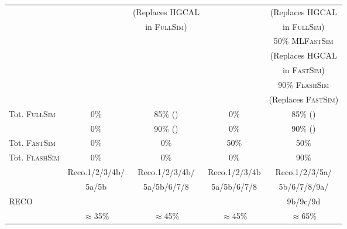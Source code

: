 \begin{table}[htbp]
\begin{tabular}{|l|c|c|c|c|}
	\cellcolor{tablerowheader}                &                 & (Replaces HGCAL &                       & (Replaces HGCAL   \\
	\cellcolor{tablerowheader}                &                 & in \textsc{FullSim})  
		                                      &                 & in \textsc{FullSim})    \\ 
	\cellcolor{tablerowheader}                &                 &                       &                       & 50\% \textsc{MLFastSim}  \\  
	\cellcolor{tablerowheader}                &                 &                       &                       & (Replaces HGCAL   \\
	\cellcolor{tablerowheader}                &                 &                       &                       & in \textsc{FastSim})   \\
	\cellcolor{tablerowheader}                &                 &                       &                       & 90\% \textsc{FlashSim}  \\  
	\cellcolor{tablerowheader}                &                 &                       &                       & (Replaces \textsc{FastSim})   \\ \hline
	\cellcolor{tablerowheader}  Tot. \textsc{FullSim}  & 0\%             & 85\% (\RunFour)       & 0\%                   & 85\% (\RunFour)    \\
	\cellcolor{tablerowheader}                & 0\%             & 90\% (\RunFive)       &  0\%                  & 90\% (\RunFive)    \\
	\cellcolor{tablerowheader}  Tot. \textsc{FastSim}  & 0\%             & 0\%                   & 50\%                  &  50\%   \\
	\cellcolor{tablerowheader}  Tot. \textsc{FlashSim} & 0\%             & 0\%                   & 0\%                   &  90\%   \\\hline   
	\cellcolor{tablerowheader}                &   Reco.1/2/3/4b/&  Reco.1/2/3/4b/       & Reco.1/2/3/4b         &  Reco.1/2/3/5a/  \\ 
	\cellcolor{tablerowheader}                &   5a/5b         &  5a/5b/6/7/8          &  5a/5b/6/7/8          &  5b/6/7/8/9a/ \\    
	\cellcolor{tablerowheader}   RECO   &                 &                       &                       & 9b/9c/9d   \\    
	\cellcolor{tablerowheader}                & $\approx$35\%      &  $\approx$45\%           &  $\approx$45\%           &  $\approx$65\%   \\ 

	\hline

	\end{tabular}
	\label{tab:effects-of-rnd-scenarios-gpu}
\end{table}

